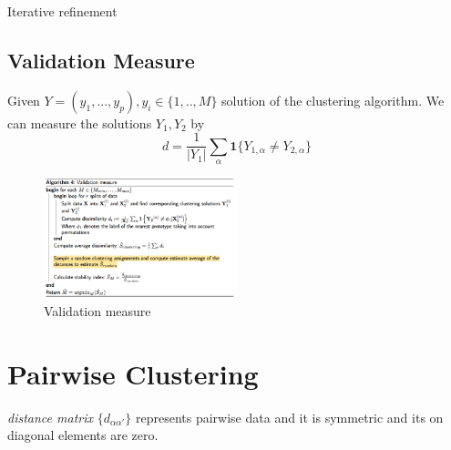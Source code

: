 \begin{algorithm}[H]
\caption{Iterative refinement}
\end{algorithm}

\subsection{Validation Measure}
Given $Y = (y_1, ..., y_p), y_i \in \{1,..,M\}$ solution of the clustering algorithm. We can measure the solutions $Y_1, Y_2$ by 
$$
d = \frac{1}{|Y_1|} \sum_\alpha \boldsymbol{1}\{ Y_{1,\alpha} \ne Y_{2,\alpha} \}
$$


\begin{figure}[hbt]
	\center
  \includegraphics[width=0.5\textwidth]{figures/cl-validation-measure}
  \caption{Validation measure}
\end{figure}



\section{Pairwise Clustering}
\textit{distance matrix} $\{ d_{\alpha \alpha'} \}$ represents pairwise data and it is symmetric and its on diagonal elements are zero.

